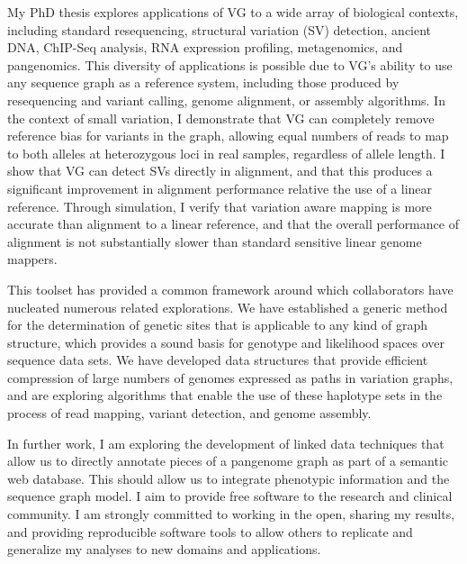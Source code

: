 \documentclass{nihbiosketch}
\newcommand{\hijournal}[1]{{\bf \textcolor{gray}{\uline{#1}}}}
\begin{document}
\begin{enumerate}
My PhD thesis explores applications of VG to a wide array of biological contexts, including standard resequencing, structural variation (SV) detection, ancient DNA, ChIP-Seq analysis, RNA expression profiling, metagenomics, and pangenomics. This diversity of applications is possible due to VG’s ability to use any sequence graph as a reference system, including those produced by resequencing and variant calling, genome alignment, or assembly algorithms. In the context of small variation, I demonstrate that VG can completely remove reference bias for variants in the graph, allowing equal numbers of reads to map to both alleles at heterozygous loci in real samples, regardless of allele length. I show that VG can detect SVs directly in alignment, and that this produces a significant improvement in alignment performance relative the use of a linear reference. Through simulation, I verify that variation aware mapping is more accurate than alignment to a linear reference, and that the overall performance of alignment is not substantially slower than standard sensitive linear genome mappers.

This toolset has provided a common framework around which collaborators have nucleated numerous related explorations. We have established a generic method for the determination of genetic sites that is applicable to any kind of graph structure, which provides a sound basis for genotype and likelihood spaces over sequence data sets. We have developed data structures that provide efficient compression of large numbers of genomes expressed as paths in variation graphs, and are exploring algorithms that enable the use of these haplotype sets in the process of read mapping, variant detection, and genome assembly.

In further work, I am exploring the development of linked data techniques that allow us to directly annotate pieces of a pangenome graph as part of a semantic web database. This should allow us to integrate phenotypic information and the sequence graph model. I aim to provide free software to the research and clinical community. I am strongly committed to working in the open, sharing my results, and providing reproducible software tools to allow others to replicate and generalize my analyses to new domains and applications.

  \begin{enumerate} %



\end{enumerate}
\end{enumerate}
\end{document}
